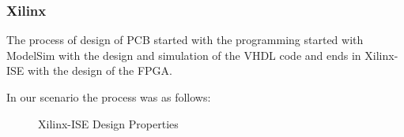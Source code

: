 \documentclass[12pt]{article}
\begin{document}
\subsubsection{Xilinx}

The process of design of PCB started with the programming started with ModelSim with the design and simulation of the VHDL code and ends in Xilinx-ISE with the design of the FPGA. 

In our scenario the process was as follows:

  
\begin{figure}[!h]
\caption{Xilinx-ISE Design Properties}
\label{fig:xil1}
\end{figure}
\end{document}
